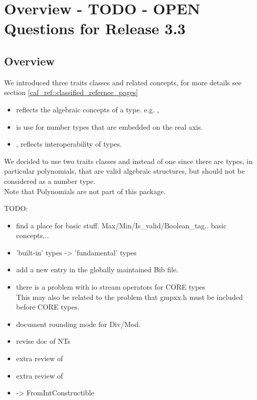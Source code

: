 \section{Overview - TODO - OPEN Questions for Release 3.3}

\subsection{Overview}

We introduced three traits classes and related concepts, for more details see 
section \ref{caf_ref::classified_refernce_pages}
\begin{itemize}
\item {} reflects the algebraic concepts of a 
      type. e.g. , 
\item {} is use for number types that are embedded on 
      the real axis. 
\item {}, reflects interoperability of types. 
\end{itemize}

We decided to use two traits classes  
and  instead of one  since there are 
types, in particular polynomials, that are valid algebraic structures, 
but should not be considered as a number type.\\
Note that Polynomials are not part of this package. 

TODO:
\begin{itemize}
\item find a place for basic stuff. Max/Min/Is\_valid/Boolean\_tag..
      basic concepts...
\item 'built-in' types -> 'fundamental' types 
\item add a new entry in the globally maintained Bib file.
\item there is a problem with io stream operators for CORE types \\
      This may also be related to the problem that gmpxx.h must be included 
      before CORE types. 
\item document rounding mode for Div/Mod. 
\item revise doc of NTs
\item extra review of 
\item extra review of 
\item {} -> FromIntConstructible
\end{itemize}

